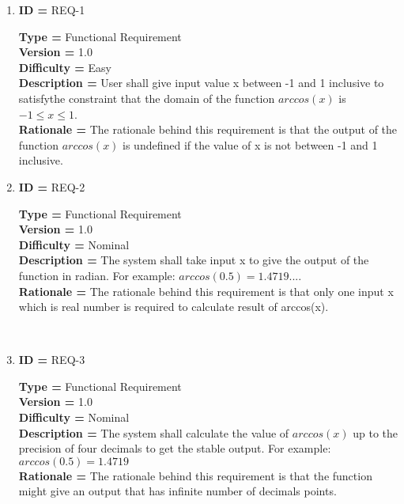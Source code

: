 \documentclass{article}
\begin{document}
\begin{enumerate}[label=(\alph*)]
\item \textbf{ID = } REQ-1
\\
\begin{Large}
 \large \textbf{Type = } Functional Requirement
 \\
 \large \textbf{Version = } 1.0
 \\
 \large \textbf{Difficulty =} Easy
 \\
 \large \textbf{ Description  = }User shall give input value x between -1 and 1 inclusive to satisfythe constraint that the domain of the function $arccos(x)$ is $-1\le x\le1$.
 \\
  \large \textbf{Rationale =} The rationale behind this requirement is that the output of the function $arccos(x)$ is undefined if the value of x is not between -1 and 1 inclusive.
 \\
 
\end{Large}

\item \textbf{ID = } REQ-2
\\
\begin{Large}
 \large \textbf{Type = } Functional Requirement
 \\
 \large \textbf{Version = } 1.0
 \\
  \large \textbf{Difficulty =} Nominal
  \\
 \large \textbf{ Description  = } The system shall take input x to give the output of the function in radian. For example: $arccos(0.5)=1.4719...$.
 \\
  \large \textbf{Rationale =} The rationale behind this requirement is that only one input x which is real number is required to calculate result of arccos(x).
 \\

\end{Large}
\\

\item \textbf{ID = } REQ-3
\\
\begin{Large}
 \large \textbf{Type = } Functional Requirement
 \\
 \large \textbf{Version = } 1.0
 \\
  \large \textbf{Difficulty =} Nominal
  \\
 \large \textbf{ Description  = } The system shall calculate the value of $arccos(x)$ up to the precision of four decimals to get the stable output. For example: $arccos(0.5)=1.4719$
 \\
  \large \textbf{Rationale =} The rationale behind this requirement is that the function might give an output that has infinite number of decimals points. 
 \\

\end{Large}
\end{enumerate}
\end{document}
